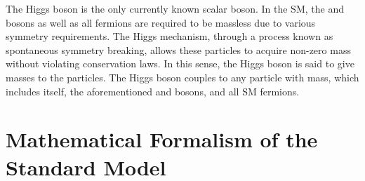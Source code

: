 The Higgs boson is the only currently known scalar boson. In the SM, the \PZ and \PWpm bosons as well as all fermions are required to be massless due to various symmetry requirements. The Higgs mechanism, through a process known as spontaneous symmetry breaking, allows these particles to acquire non-zero mass without violating conservation laws. In this sense, the Higgs boson is said to give masses to the particles. The Higgs boson couples to any particle with mass, which includes itself, the aforementioned \PZ and \PWpm bosons, and all SM fermions.

\section{Mathematical Formalism of the Standard Model} \label{sec:sm_theory}

